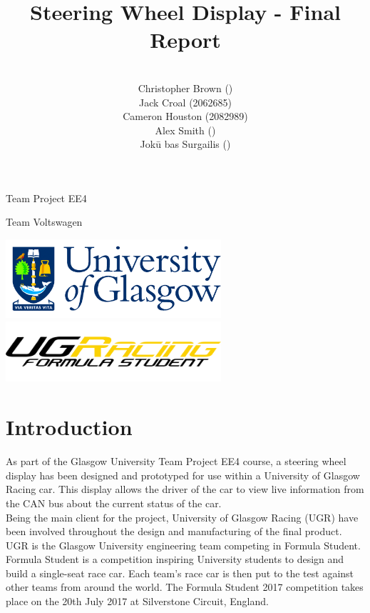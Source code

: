 \documentclass[a4paper,12pt]{article}
\author{\vspace{1cm} \\
        Christopher Brown () \\
        Jack Croal (2062685) \\
        Cameron Houston (2082989) \\
        Alex Smith () \\
        Jok\=u bas Surgailis () \\
}
\date{}
\title{\vspace{4.0cm}Steering Wheel Display - Final Report}
\begin{document}
\maketitle

\thispagestyle{empty}

\begin{center}
\Large{Team Project EE4}
\end{center}

\begin{center}
\huge{Team Voltswagen}
\end{center}

\vspace{2.0cm}

\begin{center}
\includegraphics[width=8cm]{Figures/uni_logo.png}
\includegraphics[width=8cm]{Figures/ugr_logo_black.png}
\end{center}

\newpage
\clearpage
{}

\tableofcontents


\newpage
\section{Introduction}
\label{sec:introduction}

As part of the Glasgow University Team Project EE4 course, a steering wheel display has been designed and prototyped for use within a University of Glasgow Racing car. This display allows the driver of the car to view live information from the CAN bus about the current status of the car. \\

Being the main client for the project, University of Glasgow Racing (UGR) have been involved throughout the design and manufacturing of the final product. UGR is the Glasgow University engineering team competing in Formula Student. Formula Student is a competition inspiring University students to design and build a single-seat race car. Each team’s race car is then put to the test against other teams from around the world. The Formula Student 2017 competition takes place on the 20th July 2017 at Silverstone Circuit, England. \\
\end{document}

